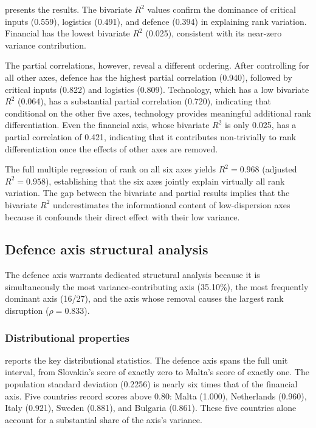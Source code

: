 

 presents the results.  The bivariate
$R^2$ values confirm the dominance of critical inputs (0.559),
logistics (0.491), and defence (0.394) in explaining rank variation.
Financial has the lowest bivariate $R^2$ (0.025), consistent with its
near-zero variance contribution.

The partial correlations, however, reveal a different ordering.
After controlling for all other axes, defence has the highest partial
correlation (0.940), followed by critical inputs (0.822) and
logistics (0.809).  Technology, which has a low bivariate $R^2$
(0.064), has a substantial partial correlation (0.720), indicating
that conditional on the other five axes, technology provides
meaningful additional rank differentiation.  Even the financial axis,
whose bivariate $R^2$ is only 0.025, has a partial correlation of
0.421, indicating that it contributes non-trivially to rank
differentiation once the effects of other axes are removed.

The full multiple regression of rank on all six axes yields
$R^2 = 0.968$ (adjusted $R^2 = 0.958$), establishing that the six
axes jointly explain virtually all rank variation.  The gap between the bivariate and partial results implies
that the bivariate $R^2$ underestimates the informational content of
low-dispersion axes because it confounds their direct effect with
their low variance.

\subsection{Defence axis structural analysis}\label{sec:defence-structural}

The defence axis warrants dedicated structural analysis because it is
simultaneously the most variance-contributing axis (35.10\%), the most
frequently dominant axis (16/27), and the axis whose removal causes
the largest rank disruption ($\rho = 0.833$).

\subsubsection{Distributional properties}



 reports the key distributional
statistics.  The defence axis spans the full unit interval, from
Slovakia's score of exactly zero to Malta's score of exactly one.
The population standard deviation (\num{0.2256}) is nearly six
times that of the financial axis.  Five countries record scores above
0.80: Malta (1.000), Netherlands (0.960), Italy (0.921), Sweden
(0.881), and Bulgaria (0.861).  These five countries alone account for
a substantial share of the axis's variance.

